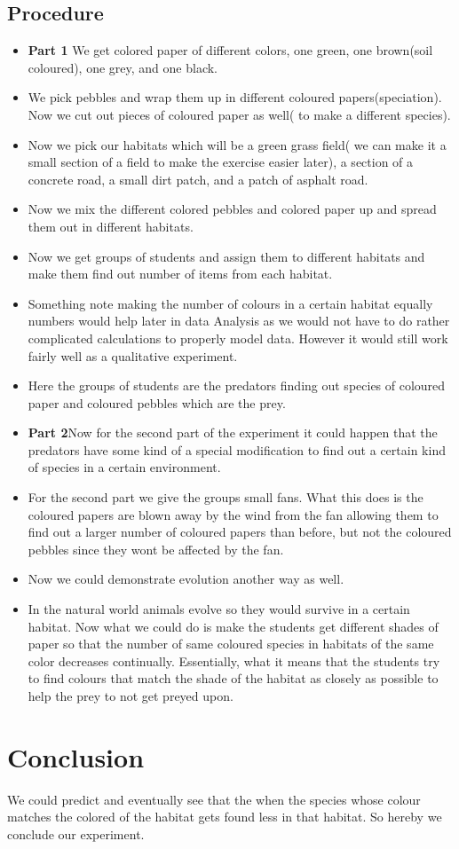 \documentclass{scrartcl}
\begin{document}
\subsection{Procedure}
\begin{itemize}
    \item \textbf{Part 1} We get colored paper of different colors, one green, one brown(soil coloured), one grey, and one black.
    \item We pick pebbles and wrap them up in different coloured papers(speciation). Now we cut out pieces of coloured paper as well( to make a different species).

    \item Now we pick our habitats which will be a green grass field( we can make it a small section of a field to make the exercise easier later), a section of a concrete road, a small dirt patch, and a patch of asphalt road.
    \item Now we mix the different colored pebbles and colored paper up and spread them out in different habitats.
    \item Now we get groups of students and assign them to different habitats and make them find out number of items from each habitat.
    \item Something note making the number of colours in a certain habitat equally numbers would help later in data Analysis as we would not have to do rather complicated calculations to properly model data. However it would still work fairly well as a qualitative experiment.
    \item Here the groups of students are the predators finding out species of coloured paper and coloured pebbles which are the prey. 
    \item \textbf{Part 2}Now for the second part of the experiment it could happen that the predators have some kind of a special modification to find out a certain kind of species in a certain environment. 
    \item For the second part we give the groups small fans. What this does is the coloured papers are blown away by the wind from the fan allowing them to find out a larger number of coloured papers than before, but not the coloured pebbles since they wont be affected by the fan.
    \item Now we could demonstrate evolution another way as well.
    \item In the natural world animals evolve so they would survive in a certain habitat. Now what we could do is make the students get different shades of paper so that the number of same coloured species in habitats of the same color decreases continually. Essentially, what it means that the students try to find colours that match the shade of the habitat as closely as possible to help the prey to not get preyed upon.
\end{itemize}

\section{Conclusion}
 We could predict and eventually see that the when the species whose colour matches the colored of the habitat gets found less in that habitat. So hereby we conclude our experiment.
\end{document}
